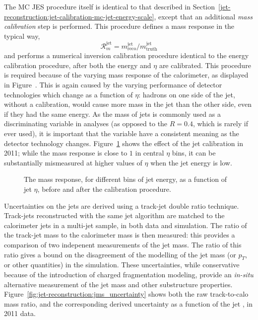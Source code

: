 The MC JES procedure itself is identical to that described in Section~\ref{jet-reconstruction:jet-calibration-mc-jet-energy-scale}, except that an additional \textit{mass calibration} step is performed. This procedure defines a mass response in the typical way,
%
\begin{equation}
\mathcal{R}^{\mathrm{jet}}_m = m^{\mathrm{jet}}_{\mathrm{reco}} /  m^{\mathrm{jet}}_{\mathrm{truth}} 
\end{equation}
%
and performs a numerical inversion calibration procedure identical to the energy calibration procedure, after both the energy and $\eta$ are calibrated. This procedure is required because of the varying mass response of the calorimeter, as displayed in Figure~. This is again caused by the varying performance of detector technologies which change as a function of $\eta$: hadrons on one side of the jet, without a calibration, would cause more mass in the jet than the other side, even if they had the same energy. As the mass of \largeR jets is commonly used as a discriminating variable in analyses (as opposed to the $R=0.4$, which is rarely if ever used), it is important that the variable have a consistent meaning as the detector technology changes. Figure~\ref{fig:jet-reconstruction:total_jms} shows the effect of the jet calibration in 2011; while the mass response is close to $1$ in central $\eta$ bins, it can be substantially mismeasured at higher values of $\eta$ when the jet energy is low.

\begin{figure}
\centering
{}
\label{fig:jet-reconstruction:total_jms}
\caption{The mass response, for different bins of jet energy, as a function of jet $\eta$, before and after the calibration procedure.}
\end{figure}

Uncertainties on the \largeR jets are derived using a track-jet double ratio technique. Track-jets reconstructed with the same jet algorithm are matched to the calorimeter jets in a multi-jet sample, in both data and simulation. The ratio of the track-jet mass to the calorimeter mass is then measured: this provides a comparison of two indepenent measurements of the jet mass. The ratio of this ratio gives a bound on the disagreement of the modelling of the jet mass (or $p_T$, or other quantities) in the simulation.  These uncertainties, while conservative because of the introduction of charged fragmentation modeling, provide an \textit{in-situ} alternative measurement of the jet mass and other substructure properties. Figure~\ref{fig:jet-reconstruction:jms_uncertainty} shows both the raw track-to-calo mass ratio, and the corresponding derived uncertainty as a function of the jet \pt, in 2011 data.


